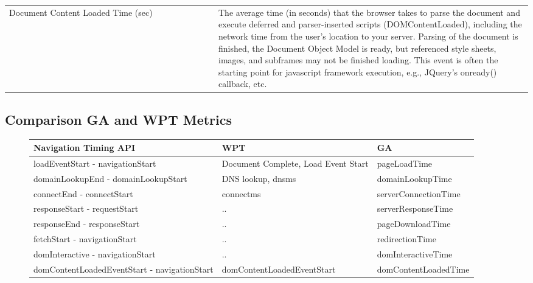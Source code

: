 \begin{center}
\begin{tabular}{ p{0.4\linewidth} | p{0.6\linewidth} }
	Document Content Loaded Time (sec) & The average time (in seconds) that the browser takes to parse the document and execute deferred and parser-inserted scripts (DOMContentLoaded), including the network time from the user's location to your server. Parsing of the document is finished, the Document Object Model is ready, but referenced style sheets, images, and subframes may not be finished loading. This event is often the starting point for javascript framework execution, e.g., JQuery's onready() callback, etc.  \\
	\end{tabular}
\end{center}











\subsection{Comparison GA and WPT Metrics}


\begin{sidewaysfigure}

\begin{center}
	\begin{tabular}{ l | l | l }
	Navigation Timing API & WPT & GA \\ 
	\hline
	loadEventStart - navigationStart & Document Complete, Load Event Start & pageLoadTime \\
	domainLookupEnd - domainLookupStart & DNS lookup, dns\textunderscore ms & domainLookupTime \\
	connectEnd - connectStart & connect\textunderscore ms & serverConnectionTime \\
	responseStart - requestStart & .. & serverResponseTime \\
	responseEnd - responseStart & .. & pageDownloadTime \\
	fetchStart - navigationStart & .. & redirectionTime \\
	domInteractive - navigationStart & .. & domInteractiveTime \\
	domContentLoadedEventStart - navigationStart & domContentLoadedEventStart & domContentLoadedTime \\
	\end{tabular}
\end{center}


\end{sidewaysfigure}





